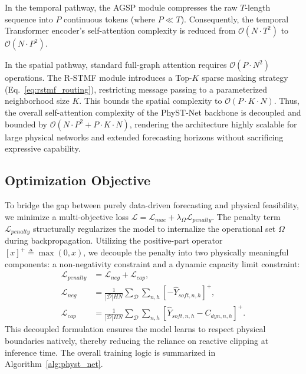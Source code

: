 In the temporal pathway, the AGSP module compresses the raw $T$-length sequence into $P$ continuous tokens (where $P \ll T$). Consequently, the temporal Transformer encoder's self-attention complexity is reduced from $\mathcal{O}(N \cdot T^2)$ to $\mathcal{O}(N \cdot P^2)$. 

In the spatial pathway, standard full-graph attention requires $\mathcal{O}(P \cdot N^2)$ operations. The R-STMF module introduces a Top-$K$ sparse masking strategy (Eq.~\ref{eq:rstmf_routing}), restricting message passing to a parameterized neighborhood size $K$. This bounds the spatial complexity to $\mathcal{O}(P \cdot K \cdot N)$. Thus, the overall self-attention complexity of the PhyST-Net backbone is decoupled and bounded by $\mathcal{O}(N \cdot P^2 + P \cdot K \cdot N)$, rendering the architecture highly scalable for large physical networks and extended forecasting horizons without sacrificing expressive capability.

\subsection{Optimization Objective}
\label{sec:optimization}
To bridge the gap between purely data-driven forecasting and physical feasibility, we minimize a multi-objective loss $\mathcal{L} = \mathcal{L}_{mae} + \lambda_{\Omega}\mathcal{L}_{penalty}$. The penalty term $\mathcal{L}_{penalty}$ structurally regularizes the model to internalize the operational set $\Omega$ during backpropagation. Utilizing the positive-part operator $[x]^+ \triangleq \max(0, x)$, we decouple the penalty into two physically meaningful components: a non-negativity constraint and a dynamic capacity limit constraint:
\begin{align}
\mathcal{L}_{penalty} &= \mathcal{L}_{neg} + \mathcal{L}_{cap}, \label{eq:feasibility_penalty_total} \\
\mathcal{L}_{neg} &= \frac{1}{|\mathcal{D}|HN} \sum_{\mathcal{D}} \sum_{n,h} [-\hat{Y}_{soft,n,h}]^+, \label{eq:feasibility_penalty_neg} \\
\mathcal{L}_{cap} &= \frac{1}{|\mathcal{D}|HN} \sum_{\mathcal{D}} \sum_{n,h} [\hat{Y}_{soft,n,h} - C_{dyn,n,h}]^+. \label{eq:feasibility_penalty_cap}
\end{align}
This decoupled formulation ensures the model learns to respect physical boundaries natively, thereby reducing the reliance on reactive clipping at inference time. The overall training logic is summarized in Algorithm~\ref{alg:physt_net}.

